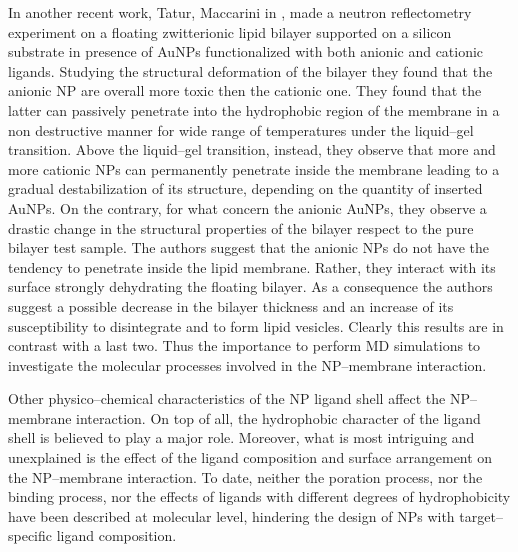 In another recent work, Tatur, Maccarini \etal in \cite{Maccarini2013}, made a neutron reflectometry experiment on a floating zwitterionic lipid bilayer supported on a silicon substrate in presence of \acp{AuNP} functionalized with both anionic and cationic ligands. Studying the structural deformation of the bilayer they found that the anionic \acs{NP} are overall more toxic then the cationic one. They found that the latter can passively penetrate into the hydrophobic region of the membrane in a non destructive manner for wide range of temperatures under the liquid--gel transition. Above the liquid--gel transition, instead, they observe that more and more cationic \acp{NP} can permanently penetrate inside the membrane leading to a gradual destabilization of its structure, depending on the quantity of inserted \acp{AuNP}. On the contrary, for what concern the anionic \acp{AuNP}, they observe a drastic change in the structural properties of the bilayer respect to the pure bilayer test sample. The authors suggest that the anionic \acp{NP} do not have the tendency to penetrate inside the lipid membrane. Rather, they interact with its surface strongly dehydrating the floating bilayer. As a consequence the authors suggest a possible decrease in the bilayer thickness and an increase of its susceptibility to disintegrate and to form lipid vesicles. Clearly this results are in contrast with a last two. Thus the importance to perform \ac{MD} simulations to investigate the molecular processes involved in the \ac{NP}--membrane interaction.

Other physico--chemical characteristics of the \ac{NP} ligand shell affect the \ac{NP}--membrane interaction. On top of all, the hydrophobic character of the ligand shell is believed to play a major role. Moreover, what is most intriguing and unexplained is the effect of the ligand composition and surface arrangement on the \ac{NP}--membrane interaction. To date, neither the poration process, nor the binding process, nor the effects of ligands with different degrees of hydrophobicity have been described at molecular level, hindering the design of \acp{NP} with target--specific ligand composition.


